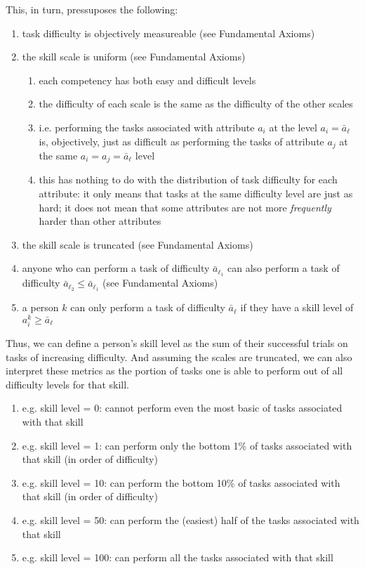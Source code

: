 \documentclass{elsarticle} %
\begin{document}
This, in turn, pressuposes the following:
\begin{enumerate}
    \item task difficulty is objectively measureable (see Fundamental Axioms)
    \item the skill scale is uniform (see Fundamental Axioms)
          \begin{enumerate}
              \item each competency has both easy and difficult levels
              \item the difficulty of each scale is the same as the difficulty of the other scales
              \item i.e. performing the tasks associated with attribute $a_i$ at the level $a_i =
                        \bar{a}_{\ell}$ is, objectively, just as difficult as performing the tasks of
                    attribute $a_j$ at the same $a_i = a_j = \bar{a}_{\ell}$ level
              \item this has nothing to do with the distribution of task difficulty for each
                    attribute: it only means that tasks at the same difficulty level are just as
                    hard; it does not mean that some attributes are not more \textit{frequently}
                    harder than other attributes
          \end{enumerate}
    \item the skill scale is truncated (see Fundamental Axioms)
    \item anyone who can perform a task of difficulty $\bar{a}_{\ell_1}$ can also perform
          a task of difficulty $\bar{a}_{\ell_2} \leq \bar{a}_{\ell_1}$ (see Fundamental
          Axioms)
    \item a person $k$ can only perform a task of difficulty $\bar{a}_{\ell}$ if they
          have a skill level of $a_{i}^{k} \geq \bar{a}_{\ell}$
\end{enumerate}

Thus, we can define a person's skill level as the sum of their successful
trials on tasks of increasing difficulty. And assuming the scales are
truncated, we can also interpret these metrics as the portion of tasks one is
able to perform out of all difficulty levels for that skill.

\begin{enumerate}
    \item e.g. skill level = 0: cannot perform even the most basic of tasks associated
          with that skill
    \item e.g. skill level = 1: can perform only the bottom 1\% of tasks associated with
          that skill (in order of difficulty)
    \item e.g. skill level = 10: can perform the bottom 10\% of tasks associated with
          that skill (in order of difficulty)
    \item e.g. skill level = 50: can perform the (easiest) half of the tasks associated
          with that skill
    \item e.g. skill level = 100: can perform all the tasks associated with that skill
\end{enumerate}
\end{document}
